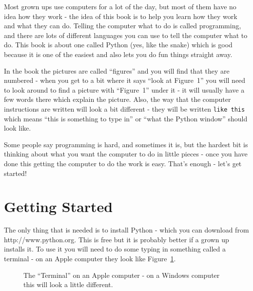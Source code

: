 \documentclass[a4paper, 11pt]{book}
\begin{document}
Most grown ups use computers for a lot of the day, but most of them
have no idea how they work - the idea of this book is to help you
learn how they work and what they can do. Telling the computer what to
do is called programming, and there are lots of different languages
you can use to tell the computer what to do. This book is about one
called Python (yes, like the snake) which is good because it is one of
the easiest and also lets you do fun things straight away. 

In the book the pictures are called ``figures'' and you will find that
they are numbered - when you get to a bit where it says ``look at
Figure~1'' you will need to look around to find a picture with
``Figure~1'' under it - it will usually have a few words there which
explain the picture. Also, the way that the computer instructions are
written will look a bit different - they will be written \verb|like this| which means ``this is something to type in'' or ``what the Python
window'' should look like.

Some people say programming is hard, and sometimes it is, but the
hardest bit is thinking about what you want the computer to do in
little pieces - once you have done this getting the computer to do the
work is easy. That's enough - let's get started!

\section{Getting Started}

The only thing that is needed is to install Python - which you can
download from http://www.python.org. This is free but it is probably
better if a grown up installs it. To use it you will need to do some
typing in something called a terminal - on an Apple computer they look
like Figure~\ref{figure-terminal}.

\begin{figure}
\label{figure-terminal}
\centering
{}
\caption{The ``Terminal'' on an Apple computer - on a Windows computer
  this will look a little different.}
\end{figure}
\end{document}
